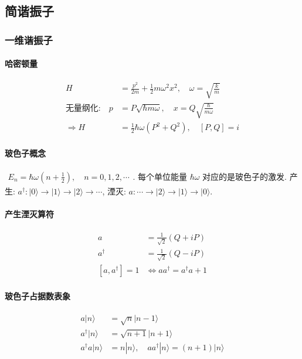 \documentclass[../../main.tex]{subfiles}
\begin{document}
\subsection{简谐振子}
\subsubsection{一维谐振子}
\paragraph{哈密顿量}
\begin{align*}
    H &= \frac{p^{2}}{2m} + \frac{1}{2}m\omega^{2}x^{2},\quad\omega = \sqrt{\frac{k}{m}}\\
    \text{无量纲化:}\quad p &= P\sqrt{\hbar m\omega},\quad x= Q\sqrt{\frac{\hbar}{m\omega}}\\
    \Rightarrow H &= \frac{1}{2}\hbar\omega(P^{2} + Q^{2}),\quad [P,Q] = i
\end{align*}
\paragraph{玻色子概念}
$\begin{aligned}
    E_{n} = \hbar\omega\left(n+\frac{1}{2}\right),\quad n = 0,1,2,\cdots
\end{aligned}$. 每个单位能量 $\hbar\omega$ 对应的是玻色子的激发. 产生: 
$a^{\dagger}:|0\rangle\rightarrow |1\rangle\rightarrow |2\rangle\rightarrow \cdots$, 湮灭: $a:\cdots\rightarrow |2\rangle\rightarrow |1\rangle\rightarrow |0\rangle$.
\paragraph{产生湮灭算符}
\begin{align*}
    a &= \frac{1}{\sqrt{2}}(Q+iP)\\
    a^{\dagger} &= \frac{1}{\sqrt{2}}(Q-iP)\\
    [a,a^{\dagger}] = 1 &\Leftrightarrow aa^{\dagger} = a^{\dagger}a + 1
\end{align*}
\paragraph{玻色子占据数表象}
\begin{align*}
    a|n\rangle &= \sqrt{n}|n-1\rangle\\
    a^{\dagger}|n\rangle &= \sqrt{n+1}|n+1\rangle\\
    a^{\dagger}a|n\rangle &= n|n\rangle,\quad aa^{\dagger}|n\rangle = (n+1)|n\rangle
\end{align*}
\end{document}
